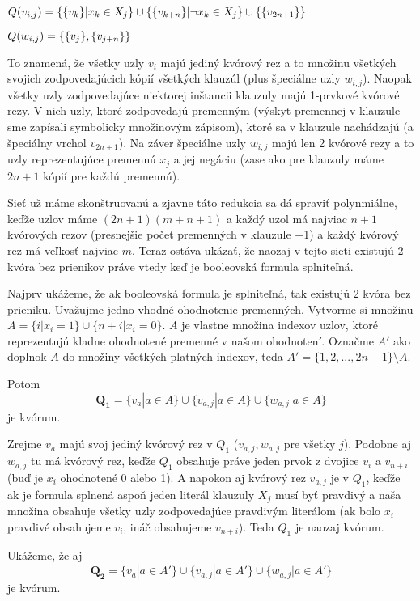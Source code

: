 $\hfill Q(v_{i,j})=\{\{v_k\} | x_k\in X_j\}\cup \{\{v_{k+n}\} | \neg x_k\in X_j\}\cup \{\{v_{2n+1}\}\}\hfill$

$\hfill Q(w_{i,j})=\{\{v_j\}, \{v_{j+n}\}\} \hfill$

\vspace{5mm}
To znamená, že všetky uzly $v_i$ majú jediný kvórový rez a to množinu
všetkých svojich zodpovedajúcich kópií všetkých klauzúl (plus špeciálne uzly
$w_{i,j}$).
Naopak všetky uzly zodpovedajúce niektorej inštancii klauzuly majú 1-prvkové
kvórové rezy. V nich uzly, ktoré zodpovedajú premenným (výskyt premennej v klauzule
sme zapísali symbolicky množinovým zápisom), ktoré sa v klauzule
nachádzajú (a špeciálny vrchol $v_{2n+1}$).
Na záver špeciálne uzly $w_{i,j}$ majú len 2 kvórové rezy a to uzly
reprezentujúce premennú $x_j$ a jej negáciu (zase ako pre klauzuly máme $2n+1$ kópií
pre každú premennú).

Sieť už máme skonštruovanú a zjavne táto redukcia sa dá spraviť polynmiálne,
keďže uzlov máme $(2n+1)(m+n+1)$ a každý uzol má najviac $n+1$ kvórových rezov
(presnejšie počet premenných v klauzule +1) a každý kvórový rez má veľkosť
najviac $m$. Teraz ostáva ukázať, že naozaj v tejto sieti existujú 2 kvóra bez
prienikov práve vtedy keď je booleovská formula splniteľná.

Najprv ukážeme, že ak booleovská formula je splniteľná, tak existujú 2 kvóra
bez prieniku.
Uvažujme jedno vhodné ohodnotenie premenných. Vytvorme si množinu\\
$A=\{i | x_i=1\}\cup \{n+i | x_i=0\}$. $A$ je vlastne množina indexov uzlov,
ktoré reprezentujú kladne ohodnotené premenné v našom ohodnotení.
Označme $A'$ ako doplnok $A$ do množiny všetkých platných indexov, teda
$A'=\{1,2,..., 2n+1\} \setminus A$.

Potom
$$\mathbf{Q_1}=\{v_a | a\in A\}\cup \{v_{a,j} | a\in A\}\cup \{w_{a,j} | a\in A\}$$
je kvórum.

Zrejme $v_a$ majú svoj jediný kvórový rez v $Q_1$ ($v_{a,j}, w_{a,j}$ pre všetky $j$).
Podobne aj $w_{a,j}$ tu má kvórový rez, keďže $Q_1$ obsahuje práve jeden
prvok z dvojice $v_i$ a $v_{n+i}$ (buď je $x_i$ ohodnotené 0 alebo 1).
A napokon aj kvórový rez $v_{a,j}$ je v $Q_1$, keďže
ak je formula splnená aspoň jeden literál klauzuly $X_j$ musí byť pravdivý a
naša množina obsahuje všetky uzly zodpovedajúce pravdivým literálom (ak bolo
$x_i$ pravdivé obsahujeme $v_i$, ináč obsahujeme $v_{n+i}$).
Teda $Q_1$ je naozaj kvórum.

Ukážeme, že aj
$$\mathbf{Q_2}=\{v_a | a\in A'\}\cup \{v_{a,j} | a\in A'\}\cup \{w_{a,j} | a\in A'\}$$
je kvórum.


